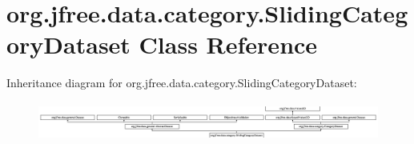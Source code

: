 \hypertarget{classorg_1_1jfree_1_1data_1_1category_1_1_sliding_category_dataset}{}\section{org.\+jfree.\+data.\+category.\+Sliding\+Category\+Dataset Class Reference}
\label{classorg_1_1jfree_1_1data_1_1category_1_1_sliding_category_dataset}
Inheritance diagram for org.\+jfree.\+data.\+category.\+Sliding\+Category\+Dataset\+:\begin{figure}[H]
\begin{center}
\leavevmode
\includegraphics[height=1.300813cm]{classorg_1_1jfree_1_1data_1_1category_1_1_sliding_category_dataset}
\end{center}
\end{figure}
